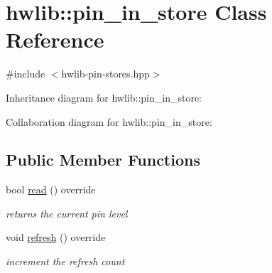 \hypertarget{classhwlib_1_1pin__in__store}{}\section{hwlib\+:\+:pin\+\_\+in\+\_\+store Class Reference}
\label{classhwlib_1_1pin__in__store}


{\ttfamily \#include $<$hwlib-\/pin-\/stores.\+hpp$>$}



Inheritance diagram for hwlib\+:\+:pin\+\_\+in\+\_\+store\+:


Collaboration diagram for hwlib\+:\+:pin\+\_\+in\+\_\+store\+:
\subsection*{Public Member Functions}
\begin{DoxyCompactItemize}
\item 
\mbox{\label{classhwlib_1_1pin__in__store_a561cf1c65fd14dbfba4c352ef4a186fa}} 
bool \hyperlink{classhwlib_1_1pin__in__store_a561cf1c65fd14dbfba4c352ef4a186fa}{read} () override
\begin{DoxyCompactList}\small\item\em returns the current pin level \end{DoxyCompactList}\item 
\mbox{\label{classhwlib_1_1pin__in__store_a74fdba836b96f7a08327e96b8921e58c}} 
void \hyperlink{classhwlib_1_1pin__in__store_a74fdba836b96f7a08327e96b8921e58c}{refresh} () override
\begin{DoxyCompactList}\small\item\em increment the refresh count \end{DoxyCompactList}\end{DoxyCompactItemize}
